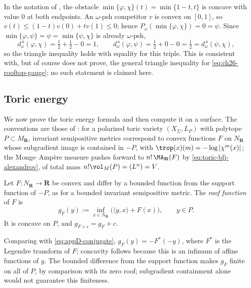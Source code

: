 \begin{example}
\label{ex:ch26-rooftop-repair}
In the notation of , the obstacle
$\min\{\varphi,\chi\}(t)=\min\{1-t,t\}$ is concave with value $0$ at both
endpoints.  An $\omega$-psh competitor $v$ is convex on $[0,1]$, so
$v(t)\leq(1-t)v(0)+tv(1)\leq0$; hence
$P_\omega(\min\{\varphi,\chi\})=0=\psi$.  Since
$\min\{\varphi,\psi\}=\psi=\min\{\psi,\chi\}$ is already $\omega$-psh,
\[
 d^{\,\vartriangle}_\omega(\varphi,\chi)
 =\tfrac12+\tfrac12-0=1,
 \qquad
 d^{\,\vartriangle}_\omega(\varphi,\psi)
 =\tfrac12+0-0=\tfrac12
 =d^{\,\vartriangle}_\omega(\psi,\chi),
\]
so the triangle inequality holds with equality for this triple.  This is
consistent with, but of course does not prove, the general triangle
inequality for \eqref{eq:ch26-rooftop-gauge}; no such statement is claimed
here.
\end{example}

\subsection{Toric energy}
\label{sec:ch26-ex-toric}

We now prove the toric energy formula and then compute it on a surface.  The
conventions are those of : for a polarized toric
variety $(X_\Sigma,L_P)$ with polytope $P\subset M_{\mathbf R}$,
invariant semipositive metrics correspond to convex functions $F$ on
$N_{\mathbf R}$ whose subgradient image is contained in $-P$, with
$\trop(x)(m)=-\log|\chi^m(x)|$; the Monge--Amp\`ere measure pushes forward
to $n!\,\MA_{\mathbf R}(F)$ by \eqref{eq:toric-bfj-alexandrov}, of total
mass $n!\vol_M(P)=(L^n)=V$.

\begin{definition}
\label{def:ch26-roof}
Let $F:N_{\mathbf R}\to\mathbf R$ be convex and differ by a bounded
function from the support function of $-P$, as for a bounded invariant
semipositive metric.  The \emph{roof function} of $F$ is
\begin{equation}
\label{eq:ch26-roof}
 g_F(y):=\inf_{x\in N_{\mathbf R}}
   \bigl(\langle y,x\rangle+F(x)\bigr),
 \qquad y\in P .
\end{equation}
It is concave on $P$, and $g_{F+c}=g_F+c$.
\end{definition}

Comparing with \eqref{eq:appD-conjugate}, $g_F(y)=-F^*(-y)$, where $F^*$
is the Legendre transform of $F$; concavity follows because this is an infimum of affine functions of $y$.
The bounded difference from the support function makes $g_F$ finite on all
of $P$, by comparison with its zero roof; subgradient containment alone
would not guarantee this finiteness.

